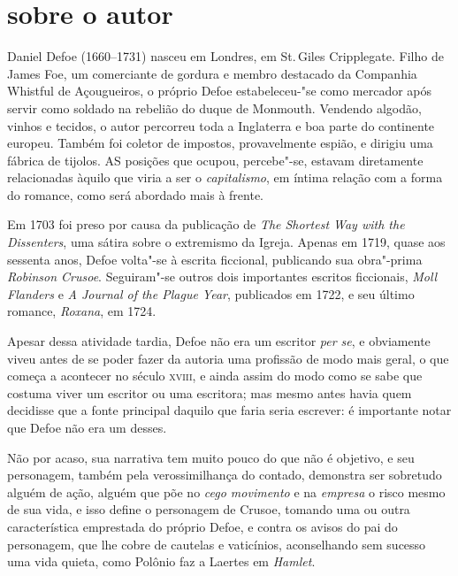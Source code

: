 
\section{sobre o autor}

Daniel Defoe (1660--1731) nasceu em Londres, em St.\,Giles Cripplegate. Filho de James Foe, um comerciante de gordura e membro destacado da Companhia Whistful de Açougueiros, o próprio Defoe estabeleceu-"se como mercador após servir como soldado na rebelião do duque de Monmouth. Vendendo algodão, vinhos e tecidos, o autor percorreu toda a Inglaterra e boa parte do continente europeu. Também foi coletor de impostos, provavelmente espião, e dirigiu uma fábrica de tijolos.
AS posições que ocupou, percebe"-se, estavam diretamente relacionadas àquilo que viria a ser o \emph{capitalismo}, em íntima relação com a forma do romance, como será abordado mais à frente.

Em 1703 foi preso por causa da publicação de \textit{The Shortest Way with the Dissenters}, uma sátira sobre o extremismo da Igreja. Apenas em 1719, quase aos sessenta anos, Defoe volta"-se à escrita ficcional, publicando sua obra"-prima \textit{Robinson Crusoe}. Seguiram"-se outros dois importantes escritos ficcionais, \textit{Moll Flanders} e \textit{A Journal of the Plague Year}, publicados em 1722, e seu último romance, \textit{Roxana},  em 1724. 

Apesar dessa atividade tardia, Defoe não era um escritor \emph{per se}, e obviamente viveu antes de se
poder fazer da autoria uma profissão de modo mais geral, o que começa a
acontecer no século \textsc{xviii}, e ainda assim do modo como se sabe que
costuma viver um escritor ou uma escritora; mas mesmo antes havia quem
decidisse que a fonte principal daquilo que faria seria escrever: é
importante notar que Defoe não era um desses.

Não por acaso, sua narrativa tem muito pouco do que não é objetivo, e
seu personagem, também pela verossimilhança do contado, demonstra ser
sobretudo alguém de ação, alguém que põe no \emph{cego movimento} e na
\emph{empresa} o risco mesmo de sua vida, e isso define o personagem de
Crusoe, tomando uma ou outra característica emprestada do próprio Defoe,
e contra os avisos do pai do personagem, que lhe cobre de cautelas e
vaticínios, aconselhando sem sucesso uma vida quieta, como Polônio faz a
Laertes em \emph{Hamlet}.

